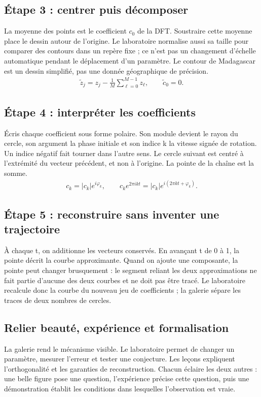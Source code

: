\documentclass[11pt,a4paper]{article}
\begin{document}
\subsection{Étape 3 : centrer puis décomposer}
La moyenne des points est le coefficient $c_0$ de la DFT. Soustraire cette moyenne place le dessin autour de l’origine. Le laboratoire normalise aussi sa taille pour comparer des contours dans un repère fixe ; ce n’est pas un changement d’échelle automatique pendant le déplacement d’un paramètre. Le contour de Madagascar est un dessin simplifié, pas une donnée géographique de précision.
\[\begin{gathered}\widetilde z_j=z_j-\frac1M\sum_{\ell=0}^{M-1}z_\ell,\qquad \widetilde c_0=0.\end{gathered}\]
\subsection{Étape 4 : interpréter les coefficients}
Écris chaque coefficient sous forme polaire. Son module devient le rayon du cercle, son argument la phase initiale et son indice k la vitesse signée de rotation. Un indice négatif fait tourner dans l’autre sens. Le cercle suivant est centré à l’extrémité du vecteur précédent, et non à l’origine. La pointe de la chaîne est la somme.
\[\begin{gathered}c_k=|c_k|e^{i\varphi_k},\qquad c_ke^{2\pi ikt}=|c_k|e^{i(2\pi kt+\varphi_k)}.\end{gathered}\]
\subsection{Étape 5 : reconstruire sans inventer une trajectoire}
À chaque t, on additionne les vecteurs conservés. En avançant t de 0 à 1, la pointe décrit la courbe approximante. Quand on ajoute une composante, la pointe peut changer brusquement : le segment reliant les deux approximations ne fait partie d’aucune des deux courbes et ne doit pas être tracé. Le laboratoire recalcule donc la courbe du nouveau jeu de coefficients ; la galerie sépare les traces de deux nombres de cercles.
\subsection{Relier beauté, expérience et formalisation}
La galerie rend le mécanisme visible. Le laboratoire permet de changer un paramètre, mesurer l’erreur et tester une conjecture. Les leçons expliquent l’orthogonalité et les garanties de reconstruction. Chacun éclaire les deux autres : une belle figure pose une question, l’expérience précise cette question, puis une démonstration établit les conditions dans lesquelles l’observation est vraie.
\end{document}
